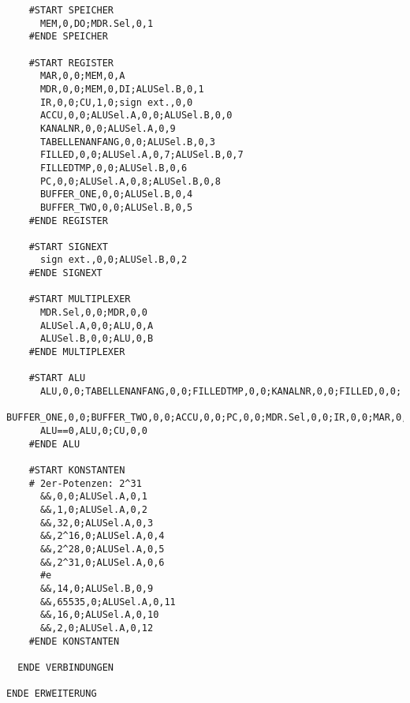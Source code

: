 {\begin{verbatim}
    #START SPEICHER  
      MEM,0,DO;MDR.Sel,0,1
    #ENDE SPEICHER 
    
    #START REGISTER
      MAR,0,0;MEM,0,A
      MDR,0,0;MEM,0,DI;ALUSel.B,0,1
      IR,0,0;CU,1,0;sign ext.,0,0
      ACCU,0,0;ALUSel.A,0,0;ALUSel.B,0,0
      KANALNR,0,0;ALUSel.A,0,9
      TABELLENANFANG,0,0;ALUSel.B,0,3
      FILLED,0,0;ALUSel.A,0,7;ALUSel.B,0,7
      FILLEDTMP,0,0;ALUSel.B,0,6
      PC,0,0;ALUSel.A,0,8;ALUSel.B,0,8
      BUFFER_ONE,0,0;ALUSel.B,0,4
      BUFFER_TWO,0,0;ALUSel.B,0,5
    #ENDE REGISTER
    
    #START SIGNEXT
      sign ext.,0,0;ALUSel.B,0,2
    #ENDE SIGNEXT
    
    #START MULTIPLEXER
      MDR.Sel,0,0;MDR,0,0
      ALUSel.A,0,0;ALU,0,A
      ALUSel.B,0,0;ALU,0,B
    #ENDE MULTIPLEXER
        
    #START ALU
      ALU,0,0;TABELLENANFANG,0,0;FILLEDTMP,0,0;KANALNR,0,0;FILLED,0,0;
        BUFFER_ONE,0,0;BUFFER_TWO,0,0;ACCU,0,0;PC,0,0;MDR.Sel,0,0;IR,0,0;MAR,0,0
      ALU==0,ALU,0;CU,0,0
    #ENDE ALU

    #START KONSTANTEN
    # 2er-Potenzen: 2^31
      &&,0,0;ALUSel.A,0,1
      &&,1,0;ALUSel.A,0,2
      &&,32,0;ALUSel.A,0,3
      &&,2^16,0;ALUSel.A,0,4
      &&,2^28,0;ALUSel.A,0,5
      &&,2^31,0;ALUSel.A,0,6
      #e
      &&,14,0;ALUSel.B,0,9
      &&,65535,0;ALUSel.A,0,11
      &&,16,0;ALUSel.A,0,10
      &&,2,0;ALUSel.A,0,12
    #ENDE KONSTANTEN
  
  ENDE VERBINDUNGEN
  
ENDE ERWEITERUNG
\end{verbatim}}